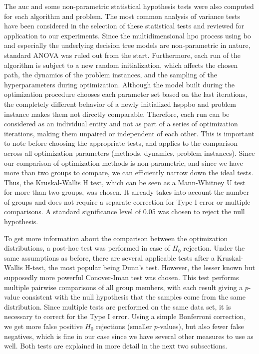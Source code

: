 The \gls{auc} and some non-parametric statistical hypothesis tests were also computed for each algorithm and problem. The most common analysis of variance tests have been considered in the selection of these statistical tests and reviewed for application to our experiments. Since the multidimensional \gls{hpo} process using \glsdesc{bo} and especially the underlying decision tree models are non-parametric in nature, standard ANOVA was ruled out from the start. Furthermore, each run of the algorithm is subject to a new random initialization, which affects the chosen path, the dynamics of the problem instances, and the sampling of the hyperparameters during optimization. Although the model built during the optimization procedure chooses each parameter set based on the last iterations, the completely different behavior of a newly initialized \gls{hsppbo} and problem instance makes them not directly comparable. Therefore, each run can be considered as an individual entity and not as part of a series of optimization iterations, making them unpaired or independent of each other. This is important to note before choosing the appropriate tests, and applies to the comparison across all optimization parameters (methods, dynamics, problem instances). Since our comparison of optimization methods is non-parametric, and since we have more than two groups to compare, we can efficiently narrow down the ideal tests. Thus, the Kruskal-Wallis H test, which can be seen as a Mann-Whitney U test for more than two groups, was chosen. It already takes into account the number of groups and does not require a separate correction for Type I error or multiple comparisons. A standard significance level of 0.05 was chosen to reject the null hypothesis. 

To get more information about the comparison between the optimization distributions, a post-hoc test was performed in case of $H_0$ rejection. Under the same assumptions as before, there are several applicable tests after a Kruskal-Wallis H-test, the most popular being Dunn's test. However, the lesser known but supposedly more powerful Conover-Iman test \cite{conover1979multiple} was chosen. This test performs multiple pairwise comparisons of all group members, with each result giving a $p$-value consistent with the null hypothesis that the samples come from the same distribution. Since multiple tests are performed on the same data set, it is necessary to correct for the Type I error. Using a simple Bonferroni correction, we get more false positive $H_0$ rejections (smaller $p$-values), but also fewer false negatives, which is fine in our case since we have several other measures to use as well.
Both tests are explained in more detail in the next two subsections.

